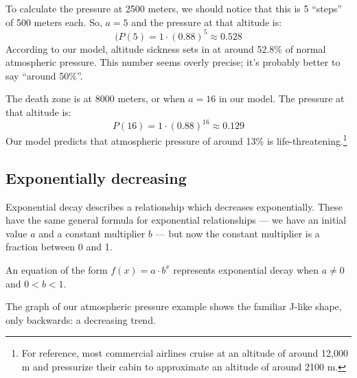 To calculate the pressure at 2500 meters, we should notice that this is 5 ``steps'' of 500 meters each. So, $a=5$ and the pressure at that altitude is:
\[(P(5) = 1\cdot(0.88)^5 \approx 0.528\]
According to our model, altitude sickness sets in at around 52.8\% of normal atmospheric pressure. This number seems overly precise; it's probably better to say ``around 50\%''.

The death zone is at 8000 meters, or when $a=16$ in our model. The pressure at that altitude is:
\[P(16) = 1\cdot(0.88)^{16} \approx 0.129\]
Our model predicts that atmospheric pressure of around 13\% is life-threatening.\footnote{For reference, most commercial airlines cruise at an altitude of around 12,000 m and pressurize their cabin to approximate an altitude of around 2100 m.}

\subsection{Exponentially decreasing}

Exponential decay describes a relationship which decreases exponentially. These have the same general formula for exponential relationships --- we have an initial value $a$ and a constant multiplier $b$ --- but now the constant multiplier is a fraction between 0 and 1.

\begin{boxdef}
An equation of the form $f(x) = a \cdot b^x$ represents exponential decay when $a \neq 0$ and $0 < b < 1$.
\end{boxdef}

The graph of our atmospheric pressure example shows the familiar J-like shape, only backwards: a decreasing trend.

\begin{center}
\end{center}

